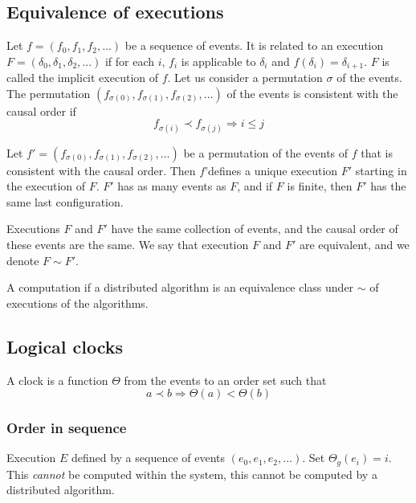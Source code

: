 \subsection{Equivalence of executions}
Let $f=(f_0,f_1,f_2,...)$ be a sequence of events. It is related to an execution $F=(\delta_0,\delta_1,\delta_2,...)$ if for each $i$, $f_i$ is applicable to $\delta_i$ and $f(\delta_i)=\delta_{i+1}$. $F$ is called the implicit execution of $f$. Let us consider a permutation $\sigma$ of the events. The permutation $(f_{\sigma(0)},f_{\sigma(1)},f_{\sigma(2)},...)$ of the events is consistent with the causal order if 
\[f_{\sigma (i)} \prec f_{\sigma(j)} \Rightarrow i \leq j\]

\begin{thm}
Let $f'=(f_{\sigma(0)},f_{\sigma(1)},f_{\sigma(2)},...)$ be a permutation of the events of $f$ that is consistent with the causal order. Then $f$'defines a unique execution $F'$ starting in the execution of $F$. $F'$ has as many events as $F$, and if $F$ is finite, then $F'$ has the same last configuration.
\end{thm}

Executions $F$ and $F'$ have the same collection of events, and the causal order of these events are the same. We say that execution $F$ and $F'$ are equivalent, and we denote $F\sim F'$.

\begin{defi}
A computation if a distributed algorithm is an equivalence class under $\sim$ of executions of the algorithms.
\end{defi} 


\subsection{Logical clocks}
\begin{defi}
A clock is a function $\Theta$ from the events to an order set such that
\[a \prec b \Rightarrow \Theta(a)<\Theta(b)\]
\end{defi}

\subsubsection{Order in sequence}
Execution $E$ defined by a sequence of events $(e_0,e_1,e_2,...)$. Set $\Theta_g (e_i)=i$. This \emph{cannot} be computed within the system, this cannot be computed by a distributed algorithm.


